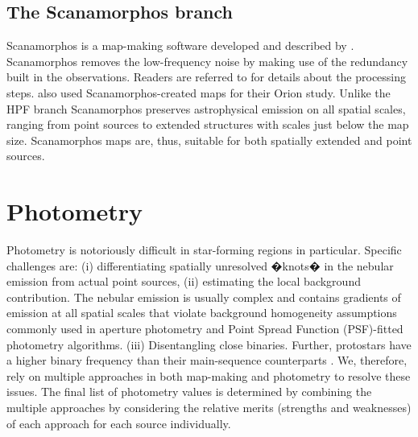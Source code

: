 \documentclass[manuscript]{aastex61}
\begin{document}
\subsection{The Scanamorphos branch}
\par
Scanamorphos is a map-making software developed and described by \cite{scanamorphos}.  Scanamorphos removes the low-frequency noise by making use of the redundancy built in the observations.  Readers are referred to \cite{scanamorphos} for details about the processing steps.   \citet{pbrpaper} also used Scanamorphos-created maps for their Orion study.  Unlike the HPF branch Scanamorphos preserves astrophysical emission on all spatial scales, ranging from point sources to extended structures with scales just below the map size.   Scanamorphos maps are, thus, suitable for both spatially extended and point sources.

\section{Photometry}
\label{sec:phot}
\par
Photometry is notoriously difficult in star-forming regions in particular.  Specific challenges are: (i) differentiating spatially unresolved �knots� in the nebular emission from actual point sources, (ii) estimating the local background contribution.  The nebular emission is usually complex and contains gradients of emission at all spatial scales that violate background homogeneity assumptions commonly used in aperture photometry and Point Spread Function (PSF)-fitted photometry algorithms.  (iii) Disentangling close binaries.  Further, protostars have a higher binary frequency than their main-sequence counterparts \citep{binaries}.  We, therefore, rely on multiple approaches in both map-making and photometry to resolve these issues.  The final list of photometry values is determined by combining the multiple approaches by considering the relative merits (strengths and weaknesses) of each approach for each source individually.
\end{document}
